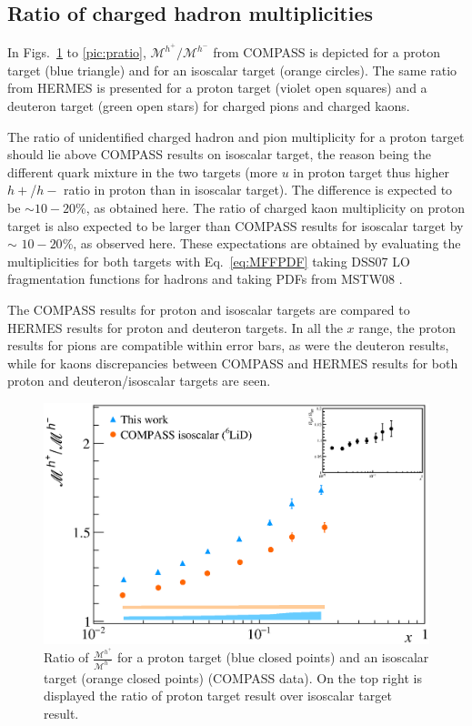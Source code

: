 \subsection{Ratio of charged hadron multiplicities}

In Figs.~\ref{pic:hratio} to \ref{pic:pratio}, $\mathscr{M}^{h^+}/\mathscr{M}^{h^-}$ from COMPASS is depicted for a proton target (blue triangle) and for an isoscalar target (orange circles). The same ratio from HERMES is presented for a proton target (violet open squares) and a deuteron target (green open stars) for charged pions and charged kaons.

The ratio of unidentified charged hadron and pion multiplicity for a proton target should lie above COMPASS results on isoscalar target, the reason being the different quark mixture in the two targets (more $u$ in proton target thus higher $h+$/$h-$ ratio in proton than in isoscalar target). The difference is expected to be $\sim$$10-20$\%, as obtained here. The ratio of charged kaon multiplicity on proton target is also expected to be larger than COMPASS results for isoscalar target by $\sim$ $10-20$\%, as observed here. These expectations are obtained by evaluating the multiplicities for both targets with Eq.~\ref{eq:MFFPDF} taking DSS07 \cite{DSS07} LO fragmentation functions for hadrons and taking PDFs from MSTW08 \cite{MSTW08}.

The COMPASS results for proton and isoscalar targets are compared to HERMES results for proton and deuteron targets. In all the $x$ range, the proton results for pions are compatible within error bars, as were the deuteron results, while for kaons discrepancies between COMPASS and HERMES results for both proton and deuteron/isoscalar targets are seen.

\newpage

\begin{figure}[!h]
  \centering
	\includegraphics[scale=0.5]{./gfx/Mult_h_ratio.eps}
	\caption{Ratio of $\frac{\mathscr{M}^{h^+}}{\mathscr{M}^{h^-}}$ for a proton target (blue closed points) and an isoscalar target (orange closed points) (COMPASS data). On the top right is displayed the ratio of proton target result over isoscalar target result.}
	\label{pic:hratio}
\end{figure}

